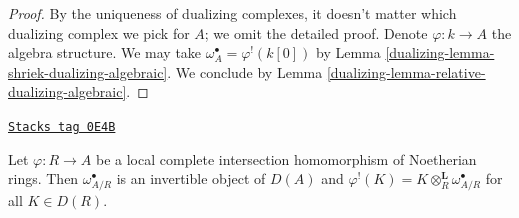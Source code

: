 \begin{proof}

By the uniqueness of dualizing complexes, it doesn't matter which
dualizing complex we pick for $A$; we omit the detailed proof.
Denote $\varphi : k \to A$ the algebra structure.
We may take $\omega_A^\bullet = \varphi^!(k[0])$ by
Lemma \ref{dualizing-lemma-shriek-dualizing-algebraic}.
We conclude by
Lemma \ref{dualizing-lemma-relative-dualizing-algebraic}.
\end{proof}

\begin{lemma}
\label{dualizing-lemma-lci-shriek}
\href{https://stacks.math.columbia.edu/tag/0E4B}{\texttt{Stacks tag 0E4B}}

Let $\varphi : R \to A$ be a local complete intersection homomorphism of
Noetherian rings. Then $\omega_{A/R}^\bullet$ is an invertible object of
$D(A)$ and $\varphi^!(K) = K \otimes_R^\mathbf{L} \omega_{A/R}^\bullet$
for all $K \in D(R)$.
\end{lemma}

